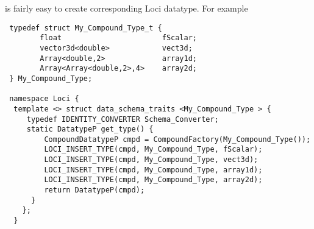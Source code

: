 is fairly easy to create corresponding Loci datatype. For example
\begin{verbatim}
 typedef struct My_Compound_Type_t {
        float                       fScalar;      
        vector3d<double>            vect3d;
        Array<double,2>             array1d;
        Array<Array<double,2>,4>    array2d;
 } My_Compound_Type;

 namespace Loci {
  template <> struct data_schema_traits <My_Compound_Type > {
     typedef IDENTITY_CONVERTER Schema_Converter;
     static DatatypeP get_type() {
         CompoundDatatypeP cmpd = CompoundFactory(My_Compound_Type());
         LOCI_INSERT_TYPE(cmpd, My_Compound_Type, fScalar);
         LOCI_INSERT_TYPE(cmpd, My_Compound_Type, vect3d);
         LOCI_INSERT_TYPE(cmpd, My_Compound_Type, array1d);
         LOCI_INSERT_TYPE(cmpd, My_Compound_Type, array2d);
         return DatatypeP(cmpd);
      }
    };
  }
\end{verbatim}
